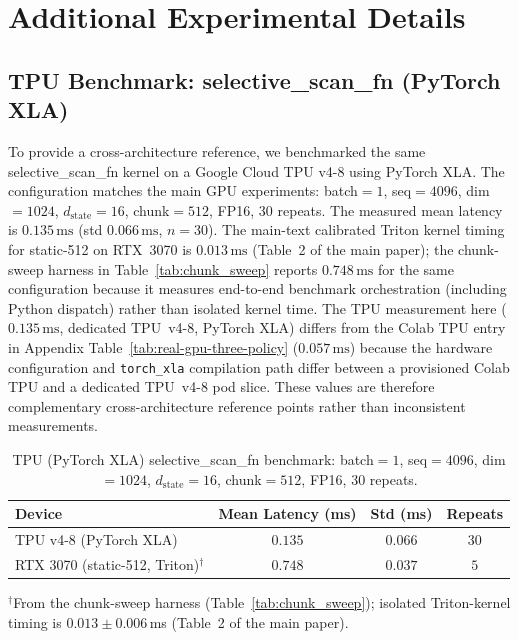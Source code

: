﻿%

\section{Additional Experimental Details}
\label{sec:appendix_details}

\subsection{TPU Benchmark: selective\_scan\_fn (PyTorch XLA)}
\label{sec:tpu_benchmark}

To provide a cross-architecture reference, we benchmarked the same selective\_scan\_fn kernel on a Google Cloud TPU v4-8 using PyTorch XLA. The configuration matches the main GPU experiments: batch$=1$, seq$=4096$, dim$=1024$, $d_{\text{state}}=16$, chunk$=512$, FP16, 30 repeats. The measured mean latency is $0.135\,\mathrm{ms}$ (std $0.066\,\mathrm{ms}$, $n=30$). The main-text calibrated Triton kernel timing for static-512 on RTX~3070 is $0.013\,\mathrm{ms}$ (Table~2 of the main paper); the chunk-sweep harness in Table~\ref{tab:chunk_sweep} reports $0.748\,\mathrm{ms}$ for the same configuration because it measures end-to-end benchmark orchestration (including Python dispatch) rather than isolated kernel time. The TPU measurement here ($0.135\,\mathrm{ms}$, dedicated TPU~v4-8, PyTorch XLA) differs from the Colab TPU entry in Appendix Table~\ref{tab:real-gpu-three-policy} ($0.057\,\mathrm{ms}$) because the hardware configuration and \texttt{torch\_xla} compilation path differ between a provisioned Colab TPU and a dedicated TPU~v4-8 pod slice. These values are therefore complementary cross-architecture reference points rather than inconsistent measurements.

\begin{table}[!t]
\centering
\caption{TPU (PyTorch XLA) selective\_scan\_fn benchmark: batch$=1$, seq$=4096$, dim$=1024$, $d_{\text{state}}=16$, chunk$=512$, FP16, 30 repeats.}
\label{tab:tpu_corey_benchmark}
\small
\begin{tabular}{lccc}
\toprule
Device & Mean Latency (ms) & Std (ms) & Repeats \\
\midrule
TPU v4-8 (PyTorch XLA) & $0.135$ & $0.066$ & $30$ \\
RTX 3070 (static-512, Triton)$^\dagger$ & $0.748$ & $0.037$ & $5$ \\
\bottomrule
\end{tabular}
{\scriptsize $^\dagger$From the chunk-sweep harness (Table~\ref{tab:chunk_sweep}); isolated Triton-kernel timing is $0.013\pm0.006$\,ms (Table~2 of the main paper).}
\end{table}

